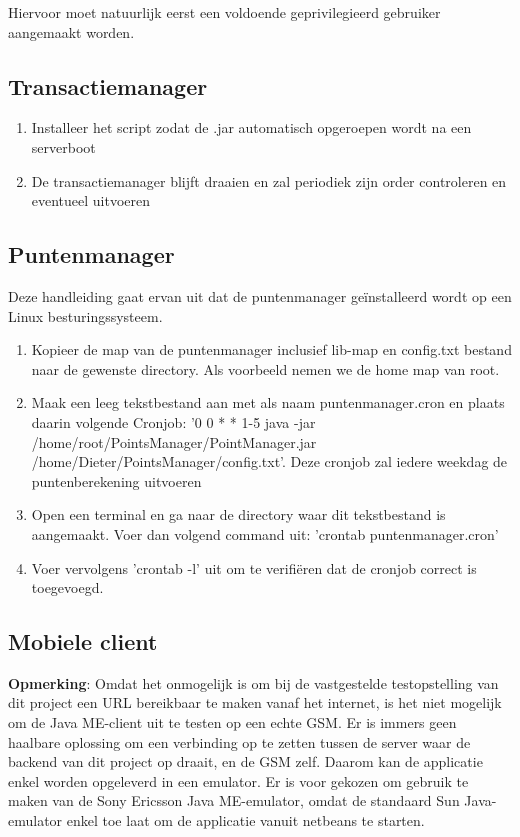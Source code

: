 Hiervoor moet natuurlijk eerst een voldoende geprivilegieerd gebruiker aangemaakt worden.


\subsection{Transactiemanager}

\begin{enumerate}
\item{Installeer het script zodat de .jar automatisch opgeroepen wordt na een serverboot}
\item{De transactiemanager blijft draaien en zal periodiek zijn order controleren en eventueel uitvoeren}
\end{enumerate}

\subsection{Puntenmanager}
Deze handleiding gaat ervan uit dat de puntenmanager ge\"installeerd wordt op een Linux besturingssysteem.
\begin{enumerate}
\item{Kopieer de map van de puntenmanager inclusief lib-map en config.txt bestand naar de gewenste directory. Als voorbeeld nemen we de home map van root.}
\item{Maak een leeg tekstbestand aan met als naam puntenmanager.cron en plaats daarin volgende Cronjob: '0 0 * * 1-5 java -jar /home/root/PointsManager/PointManager.jar /home/Dieter/PointsManager/config.txt'. Deze cronjob zal iedere weekdag de puntenberekening uitvoeren}
\item{Open een terminal en ga naar de directory waar dit tekstbestand is aangemaakt.  Voer dan volgend command uit: 'crontab puntenmanager.cron'}
\item{Voer vervolgens 'crontab -l' uit om te verifi\"eren dat de cronjob correct is toegevoegd.}
\end{enumerate}

\subsection{Mobiele client}
\textbf{Opmerking}: Omdat het onmogelijk is om bij de vastgestelde testopstelling van dit project een URL bereikbaar te maken vanaf het internet, is het niet mogelijk om de Java ME-client uit te testen op een echte GSM. Er is immers geen haalbare oplossing om een verbinding op te zetten tussen de server waar de backend van dit project op draait, en de GSM zelf. Daarom kan de applicatie enkel worden opgeleverd in een emulator. Er is voor gekozen om gebruik te maken van de Sony Ericsson Java ME-emulator, omdat de standaard Sun Java-emulator enkel toe laat om de applicatie vanuit netbeans te starten.

